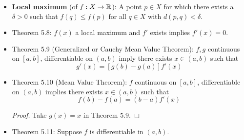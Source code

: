 \documentclass[../../notes.tex]{subfiles}
\begin{document}
\begin{itemize}
\begin{proof}
\begin{align*}
            f(t)-f(x) &= (t-x)[f'(x)+u(t)]&
                g(s)-g(y) &= (s-y)[g'(y)+v(s)]
        \end{align*}
        where $t\in[a,b]$, $s\in I$, $u(t)\to 0$ as $t\to x$, and $v(s)\to 0$ as $s\to y$. Let $s=f(t)$. Then
        \begin{align*}
            h(t)-h(x) &= g(f(t))-g(f(x))\\
            &= [f(t)-f(x)]\cdot[g'(f(x))+v(s)]\\
            &= (t-x)\cdot[f'(x)+u(t)]\cdot[g'(f(x))+v(s)]\\
            \frac{h(t)-h(x)}{t-x} &= [f'(x)+u(t)]\cdot[g'(f(x))+v(s)]
        \end{align*}
        Thus, since as $t\to x$, $s=f(t)\to f(x)=y$ by the continuity of $f$, we have that
        \begin{align*}
            h'(x) &= \lim_{t\to x}\frac{h(t)-h(x)}{t-x}\\
            &= \lim_{t\to x}[f'(x)+u(t)]\cdot[g'(f(x))+v(s)]\\
            &= [f'(x)+0]\cdot[g'(f(x))+0]\\
            &= g'(f(x))f'(x)
        \end{align*}
        as desired.
    \end{proof}
    \item \textbf{Local maximum} (of $f:X\to\mathbb{R}$): A point $p\in X$ for which there exists a $\delta>0$ such that $f(q)\leq f(p)$ for all $q\in X$ with $d(p,q)<\delta$.
    \item Theorem 5.8: $f(x)$ a local maximum and $f'$ exists implies $f'(x)=0$.
    \item Theorem 5.9 (Generalized or Cauchy Mean Value Theorem): $f,g$ continuous on $[a,b]$, differentiable on $(a,b)$ imply there exists $x\in(a,b)$ such that
    \begin{equation*}
        [f(b)-f(a)]g'(x) = [g(b)-g(a)]f'(x)
    \end{equation*}
    \item Theorem 5.10 (Mean Value Theorem): $f$ continuous on $[a,b]$, differentiable on $(a,b)$ implies there exists $x\in(a,b)$ such that
    \begin{equation*}
        f(b)-f(a) = (b-a)f'(x)
    \end{equation*}
    \begin{proof}
        Take $g(x)=x$ in Theorem 5.9.
    \end{proof}
    \item Theorem 5.11: Suppose $f$ is differentiable in $(a,b)$.

\end{itemize}
\end{document}

